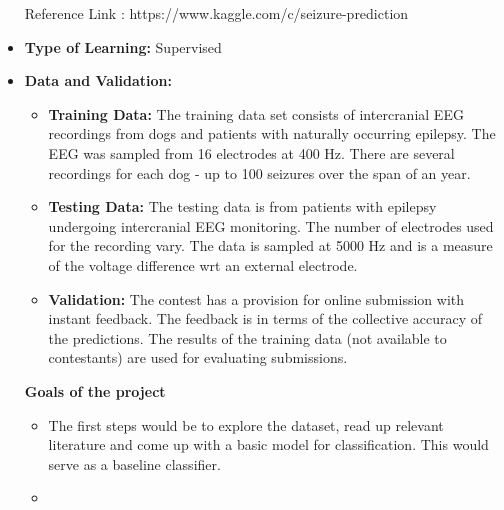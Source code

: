 \documentclass[11pt]{article}
\begin{document}
\begin{itemize}
Reference Link : https://www.kaggle.com/c/seizure-prediction

\item
\textbf{Type of Learning:} Supervised

\item
\textbf{Data and Validation:}
\begin{itemize}
\item \textbf{Training Data:} The training data set consists of intercranial EEG recordings from dogs and patients with naturally occurring epilepsy. The EEG was sampled from 16 electrodes at 400 Hz. There are several recordings for each dog - up to 100 seizures over the span of an year.
\item \textbf{Testing Data:} The testing data is from patients with epilepsy undergoing intercranial EEG monitoring. The number of electrodes used for the recording vary. The data is sampled at 5000 Hz and is a measure of the voltage difference wrt an external electrode.
\item \textbf{Validation:} The contest has a provision for online submission with instant feedback. The feedback is in terms of the collective accuracy of the predictions. The results of the training data (not available to contestants) are used for evaluating submissions.
\end{itemize}

\textbf{Goals of the project}
\begin{itemize}
\item The first steps would be to explore the dataset, read up relevant literature and come up with a basic model for classification. This would serve as a baseline classifier.
\item 
\end{itemize}

\end{itemize}
\end{document}
